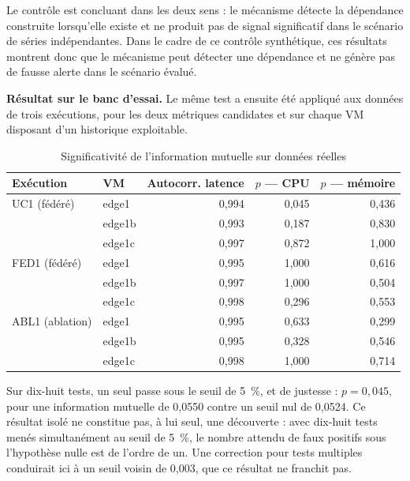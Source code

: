 Le contrôle est concluant dans les deux sens : le mécanisme détecte la dépendance construite lorsqu'elle existe et ne produit pas de signal significatif dans le scénario de séries indépendantes. Dans le cadre de ce contrôle synthétique, ces résultats montrent donc que le mécanisme peut détecter une dépendance et ne génère pas de fausse alerte dans le scénario évalué.

\textbf{Résultat sur le banc d'essai.} Le même test a ensuite été appliqué aux données de trois exécutions, pour les deux métriques candidates et sur chaque VM disposant d'un historique exploitable.

\begin{table}[H]
    \centering
    \caption{Significativité de l'information mutuelle sur données réelles}
    \label{tab:significativite-mi}
    \begin{tabular}{llrrr}
        \toprule
        \textbf{Exécution} & \textbf{VM} & \textbf{Autocorr. latence} & \textbf{$p$ — CPU} & \textbf{$p$ — mémoire} \\
        \midrule
        UC1 (fédéré)    & edge1  & 0,994 & 0,045 & 0,436 \\
                        & edge1b & 0,993 & 0,187 & 0,830 \\
                        & edge1c & 0,997 & 0,872 & 1,000 \\
        \addlinespace
        FED1 (fédéré)   & edge1  & 0,995 & 1,000 & 0,616 \\
                        & edge1b & 0,997 & 1,000 & 0,504 \\
                        & edge1c & 0,998 & 0,296 & 0,553 \\
        \addlinespace
        ABL1 (ablation) & edge1  & 0,995 & 0,633 & 0,299 \\
                        & edge1b & 0,995 & 0,328 & 0,546 \\
                        & edge1c & 0,998 & 1,000 & 0,714 \\
        \bottomrule
    \end{tabular}
\end{table}

Sur dix-huit tests, un seul passe sous le seuil de 5~\%, et de justesse : $p = 0{,}045$, pour une information mutuelle de 0,0550 contre un seuil nul de 0,0524. Ce résultat isolé ne constitue pas, à lui seul, une découverte : avec dix-huit tests menés simultanément au seuil de 5~\%, le nombre attendu de faux positifs sous l'hypothèse nulle est de l'ordre de un. Une correction pour tests multiples conduirait ici à un seuil voisin de 0,003, que ce résultat ne franchit pas.

